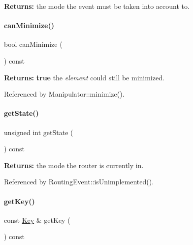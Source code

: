 {\bfseries Returns\+:} the mode the event must be taken into account to. \mbox{\label{classKite_1_1RoutingEvent_a85d665e52caee3e804921f52417b0074}} 
\paragraph{\texorpdfstring{can\+Minimize()}{canMinimize()}}
{\footnotesize\ttfamily bool can\+Minimize (\begin{DoxyParamCaption}{ }\end{DoxyParamCaption}) const\hspace{0.3cm}{\ttfamily [inline]}}

{\bfseries Returns\+:} {\bfseries true} the {\itshape element} could still be minimized. 

Referenced by Manipulator\+::minimize().

\mbox{\label{classKite_1_1RoutingEvent_a40ec2b23684a0e6e6d7ac9783a269037}} 
\paragraph{\texorpdfstring{get\+State()}{getState()}}
{\footnotesize\ttfamily unsigned int get\+State (\begin{DoxyParamCaption}{ }\end{DoxyParamCaption}) const}

{\bfseries Returns\+:} the mode the router is currently in. 

Referenced by Routing\+Event\+::is\+Unimplemented().

\mbox{\label{classKite_1_1RoutingEvent_ade1e79e88bf4f4c173ffd083dd5470c9}} 
\paragraph{\texorpdfstring{get\+Key()}{getKey()}}
{\footnotesize\ttfamily const \mbox{\hyperlink{classKite_1_1RoutingEvent_1_1Key}{Key}} \& get\+Key (\begin{DoxyParamCaption}{ }\end{DoxyParamCaption}) const\hspace{0.3cm}{\ttfamily [inline]}}


